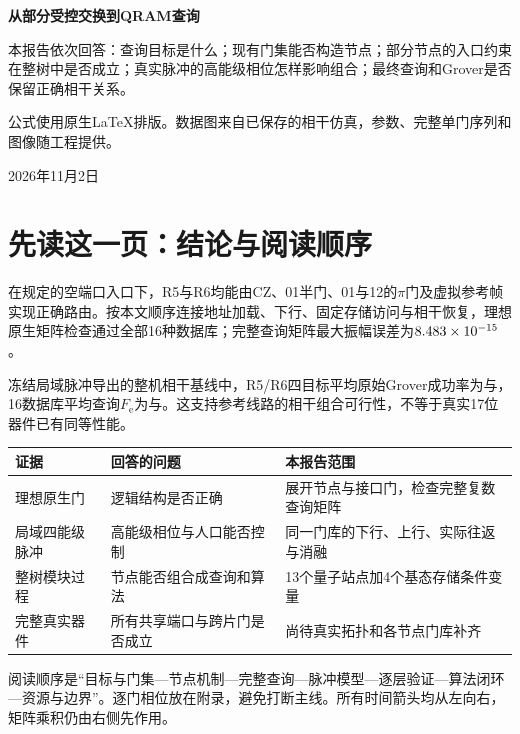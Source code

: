 \documentclass[UTF8,fontset=fandol,11pt,a4paper]{ctexart}
\newcommand{\Fe}{F_{\mathrm e}}
\begin{document}
\hypersetup{pageanchor=false}
\begin{titlepage}\centering
\vspace*{2cm}
{\Huge\bfseries 从部分受控交换到QRAM查询\par}
\vspace{.8cm}{\LARGE 线路可行性与相干脉冲验证\par}
\vspace{.6cm}{\Large R5/R6节点、固定数据库访问与单轮Grover\par}
\vspace{1.5cm}
\begin{minipage}{.88\linewidth}\large
本报告依次回答：查询目标是什么；现有门集能否构造节点；部分节点的入口约束在整树中是否成立；真实脉冲的高能级相位怎样影响组合；最终查询和Grover是否保留正确相干关系。

公式使用原生\LaTeX{}排版。数据图来自已保存的相干仿真，参数、完整单门序列和图像随工程提供。
\end{minipage}
\vfill{\large 2026年11月2日\par}
\vspace{.5cm}{\small 模拟研究，不是真机结果。主结果不含耗散、附加随机门错误或测量误差。\par}
\end{titlepage}
\hypersetup{pageanchor=true}
\section*{先读这一页：结论与阅读顺序}
在规定的空端口入口下，R5与R6均能由CZ、01半门、01与12的$\pi$门及虚拟参考帧实现正确路由。按本文顺序连接地址加载、下行、固定存储访问与相干恢复，理想原生矩阵检查通过全部16种数据库；完整查询矩阵最大振幅误差为$8.483\times10^{-15}$。

冻结局域脉冲导出的整机相干基线中，R5/R6四目标平均原始Grover成功率为\RfiveGrover{}与\RsixGrover{}，16数据库平均查询$\Fe$为\RfiveFe{}与\RsixFe{}。这支持参考线路的相干组合可行性，不等于真实17位器件已有同等性能。
\begin{center}\small\begin{tabularx}{\linewidth}{@{}p{.19\linewidth}XX@{}}\toprule
证据 & 回答的问题 & 本报告范围\\\midrule
理想原生门 & 逻辑结构是否正确 & 展开节点与接口门，检查完整复数查询矩阵\\
局域四能级脉冲 & 高能级相位与人口能否控制 & 同一门库的下行、上行、实际往返与消融\\
整树模块过程 & 节点能否组合成查询和算法 & 13个量子站点加4个基态存储条件变量\\
完整真实器件 & 所有共享端口与跨片门是否成立 & 尚待真实拓扑和各节点门库补齐\\\bottomrule
\end{tabularx}\end{center}
阅读顺序是“目标与门集---节点机制---完整查询---脉冲模型---逐层验证---算法闭环---资源与边界”。逐门相位放在附录，避免打断主线。所有时间箭头均从左向右，矩阵乘积仍由右侧先作用。
\tableofcontents\clearpage




\clearpage\appendix

\end{document}

